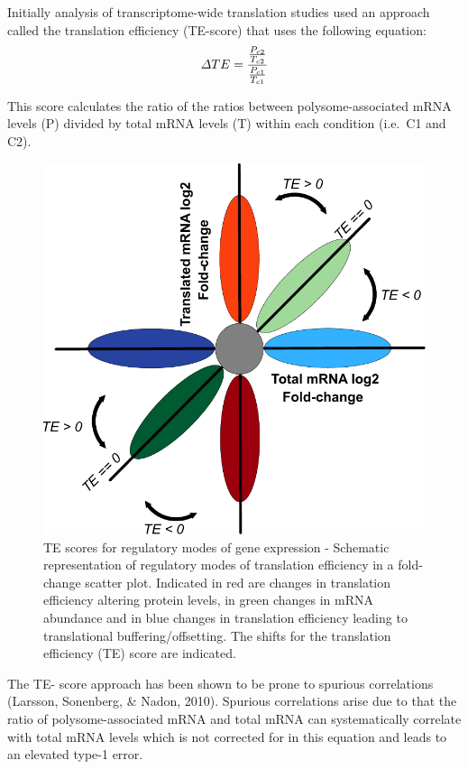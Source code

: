 \documentclass[12pt,openany]{book}
\begin{document}
Initially analysis of transcriptome-wide translation studies used an
approach called the translation efficiency (TE-score) that uses the
following equation:
\[\varDelta TE = \frac{\frac{P_{c2}}{T_{c2}}} {\frac{P_{c1}}{T_{c1}}}\\\]

This score calculates the ratio of the ratios between
polysome-associated mRNA levels (P) divided by total mRNA levels (T)
within each condition (i.e.~C1 and C2).

\begin{figure}
  \includegraphics{./figures/geneModes_TE.pdf}
  \caption{TE scores for regulatory modes of gene expression -  Schematic representation of regulatory modes of translation efficiency in a fold-change scatter plot. Indicated in red are changes in translation efficiency altering protein levels, in green changes in mRNA abundance and in blue changes in translation efficiency leading to translational buffering/offsetting. The shifts for the translation efficiency (TE) score are indicated. \label{fig:TE}}
\end{figure}

The TE- score approach has been shown to be prone to spurious
correlations (Larsson, Sonenberg, \& Nadon, 2010). Spurious correlations
arise due to that the ratio of polysome-associated mRNA and total mRNA
can systematically correlate with total mRNA levels which is not
corrected for in this equation and leads to an elevated type-1 error.
\end{document}
